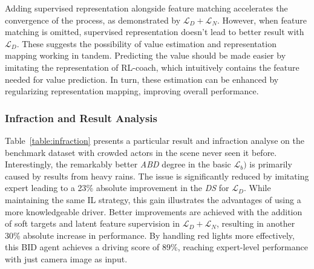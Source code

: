 %
Adding supervised representation alongside feature matching accelerates the convergence of the process, as demonstrated by $\mathcal{L}_D + \mathcal{L}_N$.
However, when feature matching is omitted, supervised representation doesn't lead to better result with $\mathcal{L}_D$.
These suggests the possibility of value estimation and representation mapping working in tandem.
Predicting the value should be made easier by imitating the representation of RL-coach, which intuitively contains the feature needed for value prediction. 
In turn, these estimation can be enhanced by regularizing representation mapping, improving overall performance.


\subsubsection{Infraction and Result Analysis}


\hspace{1pc}Table~\ref{table:infraction} presents a particular result and infraction analyse on the benchmark dataset with crowded actors in the scene never seen it before. 
Interestingly, the remarkably better \emph{ABD} degree in the basic $\mathcal{L}_b)$ is primarily caused by results from heavy rains. 
The issue is significantly reduced by imitating expert leading to a 23\% absolute improvement in the \emph{DS} for $\mathcal{L}_D$.
While maintaining the same IL strategy, this gain illustrates the advantages of using a more knowledgeable driver. 
Better improvements are achieved with the addition of soft targets and latent feature supervision in $\mathcal{L}_D+\mathcal{L}_N$, resulting in another 30\% absolute increase in performance. 
By handling red lights more effectively, this BID agent achieves a driving score of 89\%, reaching expert-level performance with just camera image as input.





 